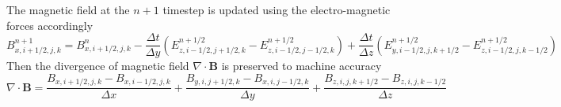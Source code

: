 \documentclass[%
 reprint,
 superscriptaddress,
 amsmath,amssymb,
 nofootinbib,
 prd,
]{revtex4-2}
\begin{document}
The magnetic field at the $n+1$ timestep is updated using the electro-magnetic forces accordingly
\begin{equation}
B_{x, i+1 / 2, j, k}^{n+1}=B_{x, i+1 / 2, j, k}^n-\frac{\Delta t}{\Delta y}\left(E_{z, i-1 / 2, j+1 / 2, k}^{n+1 / 2}-E_{z, i-1 / 2, j-1 / 2, k}^{n+1 / 2}\right)+\frac{\Delta t}{\Delta z}\left(E_{y, i-1 / 2, j, k+1 / 2}^{n+1 / 2}-E_{z, i-1 / 2, j, k-1 / 2}^{n+1 / 2}\right)
\end{equation}
Then the divergence of magnetic field $\nabla\cdot \boldsymbol{B}$ is preserved to machine accuracy
\begin{equation}
\nabla \cdot \boldsymbol{B}  =\frac{B_{x, i+1 / 2, j, k}-B_{x, i-1 / 2, j, k}}{\Delta x} 
 +\frac{B_{y, i, j+1 / 2, k}-B_{x, i, j-1 / 2, k}}{\Delta y} 
 +\frac{B_{z, i, j, k+1 / 2}-B_{z, i, j, k-1 / 2}}{\Delta z}
\end{equation}
\end{document}
